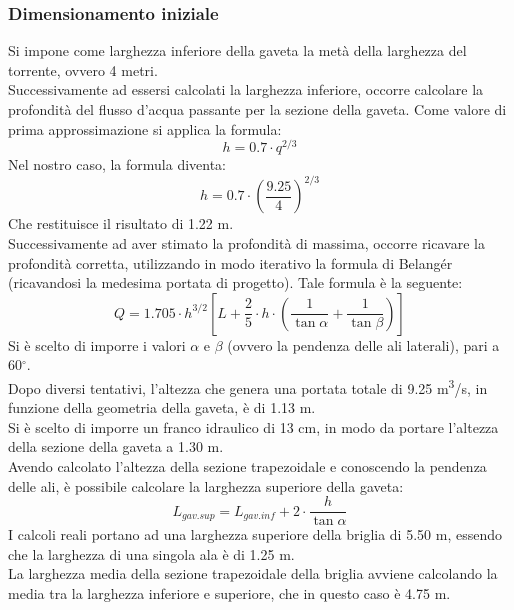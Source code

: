 \subsubsection{Dimensionamento iniziale}
Si impone come larghezza inferiore della gaveta la metà della larghezza del torrente, ovvero 4 metri.\\
Successivamente ad essersi calcolati la larghezza inferiore, occorre calcolare la profondità del flusso d'acqua passante per la sezione della gaveta. Come valore di prima approssimazione si applica la formula:
\begin{equation}
    h = 0.7 \cdot q ^{2/3}
\end{equation}
Nel nostro caso, la formula diventa:
\begin{equation}
    h = 0.7 \cdot \left( \frac{9.25}{4} \right)^{2/3}
\end{equation}
Che restituisce il risultato di 1.22 m.\\
Successivamente ad aver stimato la profondità di massima, occorre ricavare la profondità corretta, utilizzando in modo iterativo la formula di Belangér (ricavandosi la medesima portata di progetto). Tale formula è la seguente:
\begin{equation}
Q = 1.705 \cdot h^{3/2} \left[L + \frac{2}{5}\cdot h \cdot \left(\frac{1}{\tan{\alpha}} + \frac{1}{\tan{\beta}}\right) \right]
\end{equation}
Si è scelto di imporre i valori $\alpha$ e $\beta$ (ovvero la pendenza delle ali laterali), pari a 60$^\circ$.\\
Dopo diversi tentativi, l'altezza che genera una portata totale di 9.25 \unit{m^3/s}, in funzione della geometria della gaveta, è di 1.13 m.\\
Si è scelto di imporre un franco idraulico di 13 cm, in modo da portare l'altezza della sezione della gaveta a 1.30 m.\\
Avendo calcolato l'altezza della sezione trapezoidale e conoscendo la pendenza delle ali, è possibile calcolare la larghezza superiore della gaveta:
\begin{equation}
    L_{gav.sup} = L_{gav.inf} + 2 \cdot \frac{h}{\tan \alpha} 
\end{equation}
I calcoli reali portano ad una larghezza superiore della briglia di 5.50 m, essendo che la larghezza di una singola ala è di 1.25 m.\\
La larghezza media della sezione trapezoidale della briglia avviene calcolando la media tra la larghezza inferiore e superiore, che in questo caso è 4.75 m.\\
